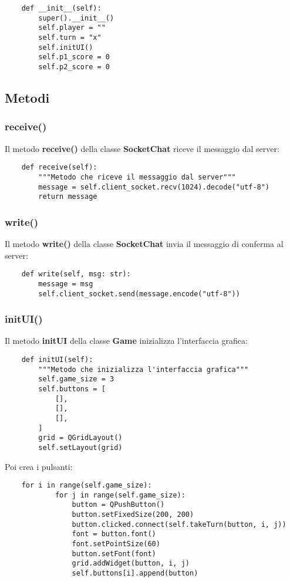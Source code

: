 \documentclass{article}
\begin{document}
\begin{verbatim}
    def __init__(self):
        super().__init__()
        self.player = ""
        self.turn = "x"
        self.initUI()
        self.p1_score = 0
        self.p2_score = 0
\end{verbatim}

\subsection{Metodi}

\subsubsection{receive()}
Il metodo \textbf{receive()} della classe \textbf{SocketChat} riceve il messaggio dal server:

\begin{verbatim}
    def receive(self):
        """Metodo che riceve il messaggio dal server"""
        message = self.client_socket.recv(1024).decode("utf-8")
        return message
\end{verbatim}

\subsubsection{write()}
Il metodo \textbf{write()} della classe \textbf{SocketChat} invia il messaggio di conferma al server:

\begin{verbatim}
    def write(self, msg: str):
        message = msg
        self.client_socket.send(message.encode("utf-8"))
\end{verbatim}
\newpage

\subsubsection{initUI()}
Il metodo \textbf{initUI} della classe \textbf{Game} inizializza l'interfaccia grafica:

\begin{verbatim}
    def initUI(self):
        """Metodo che inizializza l'interfaccia grafica"""
        self.game_size = 3
        self.buttons = [
            [],
            [],
            [],
        ]
        grid = QGridLayout()
        self.setLayout(grid)
\end{verbatim}

Poi crea i pulsanti:

\begin{verbatim}
    for i in range(self.game_size):
            for j in range(self.game_size):
                button = QPushButton()
                button.setFixedSize(200, 200)
                button.clicked.connect(self.takeTurn(button, i, j))
                font = button.font()
                font.setPointSize(60)
                button.setFont(font)
                grid.addWidget(button, i, j)
                self.buttons[i].append(button)
\end{verbatim}
\end{document}
